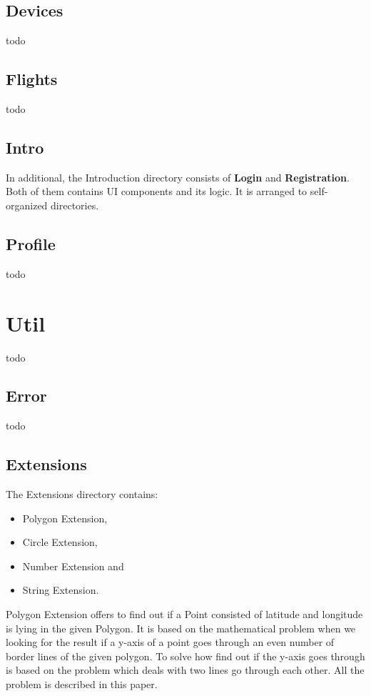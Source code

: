 \subsection{Devices}\label{subsec:devices}
todo

\subsection{Flights}\label{subsec:flights}
todo

\subsection{Intro}\label{subsec:intro}
In additional, the Introduction directory consists of \textbf{Login} and \textbf{Registration}.
Both of them contains UI components and its logic.
It is arranged to self-organized directories.

\subsection{Profile}\label{subsec:profile}
todo

\section{Util}\label{sec:util}
todo

\subsection{Error}\label{subsec:error}
todo

\subsection{Extensions}\label{subsec:extensions}
The Extensions directory contains:
\begin{itemize}
    \item Polygon Extension,
    \item Circle Extension,
    \item Number Extension and
    \item String Extension.
\end{itemize}
Polygon Extension offers to find out if a Point\cite{} consisted of latitude and longitude is lying in the given Polygon\cite{}.
It is based on the mathematical problem when we looking for the result if a y-axis of a point goes through an even number of border lines of the given polygon.
To solve how find out if the y-axis goes through is based on the problem which deals with two lines go through each other.
All the problem is described in this paper\cite{}.

